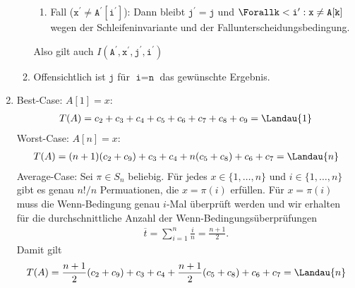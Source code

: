 \begin{solution}
\begin{enumerate}[label = (\alph*)]
\begin{enumerate}[label = \arabic*.]
\begin{enumerate}[label = \Roman*.]
      \item Fall ($\texttt{x}^\prime \neq \texttt{A}^\prime[\texttt{i}^\prime]$): Dann bleibt $\texttt{j}^\prime = \texttt{j}$ und $\Forall \texttt{k} < \texttt{i}^\prime: \texttt{x} \neq \texttt{A}[\texttt{k}]$ wegen der Schleifeninvariante und der Fallunterscheidungsbedingung.
    \end{enumerate}

    Also gilt auch $I(\texttt{A}^\prime, \texttt{x}^\prime, \texttt{j}^\prime, \texttt{i}^\prime)$

    \item Offensichtlich ist $\texttt{j}$ für $\texttt{i} = \texttt{n}$ das gewünschte Ergebnis.
  \end{enumerate}
  \item Best-Case: $A[1] = x:$
  \begin{align*}
    T(A) = c_2 + c_3 + c_4 + c_5 + c_6 + c_7 + c_8 + c_9 = \Landau{1}
  \end{align*}
  Worst-Case: $A[n] = x:$
  \begin{align*}
    T(A) = (n+1)(c_2 + c_9) + c_3 + c_4 + n(c_5 + c_8) + c_6 + c_7 = \Landau{n}
  \end{align*}
  Average-Case: Sei $\pi \in S_n$ beliebig. Für jedes $x \in \{1,\dots,n\}$
  und $i \in \{1,\dots,n\}$
  gibt es genau $n!/n$ Permuationen, die $x = \pi(i)$ erfüllen.
  Für $x = \pi(i)$ muss die Wenn-Bedingung genau $i$-Mal überprüft werden und wir erhalten
  für die durchschnittliche Anzahl der Wenn-Bedingungsüberprüfungen
  \begin{align*}
    \overline{t} = \sum_{i=1}^n \frac{i}{n} = \frac{n+1}{2}.
  \end{align*}
  Damit gilt
  \begin{align*}
    T(A) = \frac{n+1}{2}(c_2 + c_9) + c_3 + c_4 + \frac{n+1}{2}(c_5 + c_8) + c_6 + c_7 = \Landau{n}
  \end{align*}
\end{enumerate}

\end{solution}

